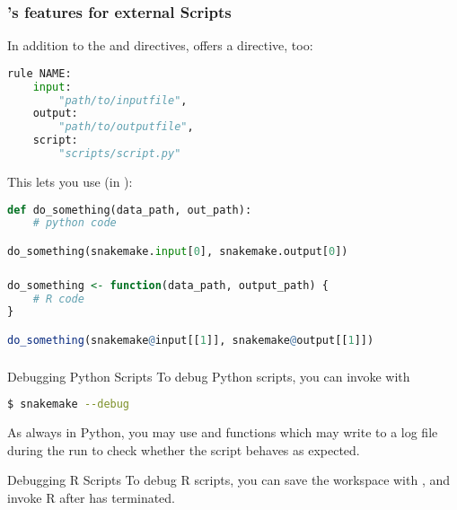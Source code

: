 \begingroup
{}
\begin{frame}[fragile]
  \frametitle{\Snakemake's features for external Scripts}
  In addition to the  and  directives, \Snakemake{} offers a  directive, too:
  \begin{lstlisting}[language=Python,style=Python]
rule NAME:
    input:
        "path/to/inputfile",
    output:
        "path/to/outputfile",
    script:
        "scripts/script.py"
  \end{lstlisting}
  This lets you use (in ):
  \begin{lstlisting}[language=Python,style=Python]
def do_something(data_path, out_path):
    # python code

do_something(snakemake.input[0], snakemake.output[0])
  \end{lstlisting}
\end{frame}
\endgroup

\begin{frame}[fragile]
  \frametitle{}
  \begin{lstlisting}[language=R,style=R]
do_something <- function(data_path, output_path) {
    # R code
}

do_something(snakemake@input[[1]], snakemake@output[[1]])
  \end{lstlisting}
\end{frame}

\begin{frame}[fragile]
  \frametitle{}
  \begin{exampleblock}{Debugging Python Scripts}
  To debug Python scripts, you can invoke \Snakemake{} with
  \begin{lstlisting}[language=Bash, style=Shell]
$ snakemake --debug
  \end{lstlisting}
  As always in Python, you may use  and  functions which may write to a log file during the run to check whether the script behaves as expected.
  \end{exampleblock}
  \pause
  \begin{exampleblock}{Debugging R Scripts}
  To debug R scripts, you can save the workspace with , and invoke R after \Snakemake{} has terminated. 
  \end{exampleblock}
\end{frame}

